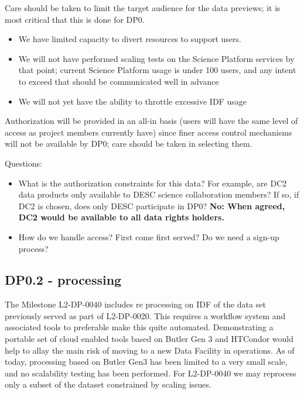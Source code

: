 Care should be taken to limit the target audience for the data previews; it is most critical that this is done for DP0.

\begin{itemize}

\item We have limited capacity to divert resources to support users.

\item We will not have performed scaling tests on the Science Platform services by that point; current Science Platform usage is under 100 users, and any intent to exceed that should be communicated well in advance

\item We will not yet have the ability to throttle excessive IDF usage

\end{itemize}

Authorization will be provided in an all-in basis (users will have the same level of access as project members currently have) since finer access control mechanisms will not be available by DP0; care should be taken in selecting them.

Questions:

\begin{itemize}

\item What is the authorization constraints for this data? For example, are DC2 data products only available to DESC science collaboration members? If so, if DC2 is chosen, does only DESC participate in DP0?
	{\bf No: When agreed, DC2 would be available to all data rights holders.}

\item How do we handle access? First come first served? Do we need a sign-up process?

\end{itemize}

\subsection{DP0.2 - processing}

The Milestone L2-DP-0040 includes re processing on IDF of the data set previously served as part of L2-DP-0020.
This requires a workflow system and associated tools to preferable make this quite automated.
Demonstrating a portable set of cloud enabled tools based on Butler Gen 3 and HTCondor would help to allay the main risk of moving to a new Data Facility in operations.
As of today, processing based on Butler Gen3 has been limited to a very small scale, and no scalability testing has been performed. For L2-DP-0040 we may reprocess only a subset of the dataset constrained by scaling issues.



